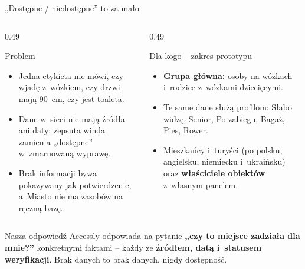 \begin{frame}{„Dostępne / niedostępne” to za mało}
  \begin{columns}[T,onlytextwidth]
    \begin{column}{0.49\textwidth}
      \begin{block}{Problem}
        \begin{itemize}
          \item Jedna etykieta nie mówi, czy wjadę z~wózkiem, czy drzwi mają 90~cm, czy jest toaleta.
          \item Dane w~sieci nie mają źródła ani daty: zepsuta winda zamienia „dostępne” w~zmarnowaną wyprawę.
          \item Brak informacji bywa pokazywany jak potwierdzenie, a~Miasto nie ma zasobów na ręczną bazę.
        \end{itemize}
      \end{block}
    \end{column}
    \begin{column}{0.49\textwidth}
      \begin{block}{Dla kogo -- zakres prototypu}
        \begin{itemize}
          \item \textbf{Grupa główna:} osoby na wózkach i~rodzice z~wózkami dziecięcymi.
          \item Te same dane służą profilom: Słabo widzę, Senior, Po zabiegu, Bagaż, Pies, Rower.
          \item Mieszkańcy i~turyści (po polsku, angielsku, niemiecku i~ukraińsku) oraz \textbf{właściciele obiektów}
                z~własnym panelem.
        \end{itemize}
      \end{block}
    \end{column}
  \end{columns}
  \vspace{1mm}
  \begin{exampleblock}{Nasza odpowiedź}
    Accessly odpowiada na pytanie \textbf{„czy to miejsce zadziała dla mnie?”} konkretnymi faktami -- każdy ze
    \textbf{źródłem, datą i~statusem weryfikacji}. Brak danych to brak danych, nigdy dostępność.
  \end{exampleblock}

\end{frame}
